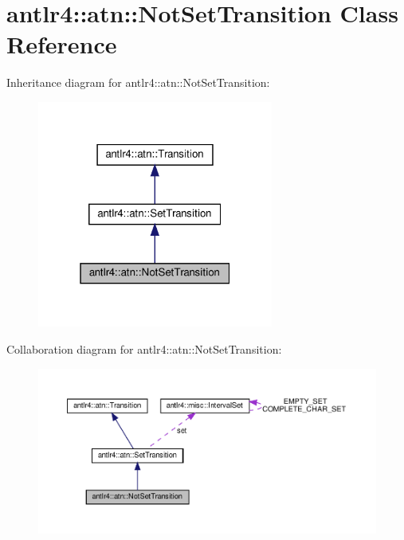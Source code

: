 \hypertarget{classantlr4_1_1atn_1_1NotSetTransition}{}\section{antlr4\+:\+:atn\+:\+:Not\+Set\+Transition Class Reference}
\label{classantlr4_1_1atn_1_1NotSetTransition}


Inheritance diagram for antlr4\+:\+:atn\+:\+:Not\+Set\+Transition\+:
\nopagebreak
\begin{figure}[H]
\begin{center}
\leavevmode
\includegraphics[width=220pt]{classantlr4_1_1atn_1_1NotSetTransition__inherit__graph}
\end{center}
\end{figure}


Collaboration diagram for antlr4\+:\+:atn\+:\+:Not\+Set\+Transition\+:
\nopagebreak
\begin{figure}[H]
\begin{center}
\leavevmode
\includegraphics[width=350pt]{classantlr4_1_1atn_1_1NotSetTransition__coll__graph}
\end{center}
\end{figure}
